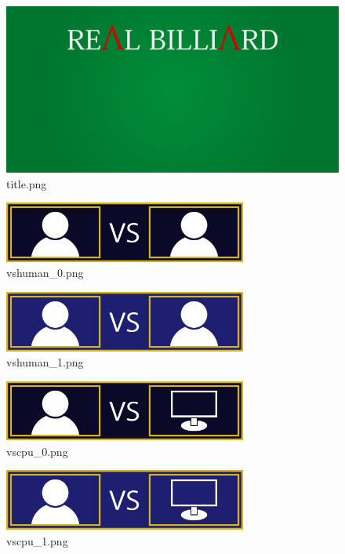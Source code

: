 \documentclass[a4j,titlepage]{jsarticle}
\begin{document}
\begin{figure}[H]
  \centering
  \includegraphics[width=12cm]{../images/title.png}
  \caption{title.png}
  \label{fig:title}
\end{figure}

\begin{figure}[H]
  \centering
  \includegraphics[width=8cm]{../images/vshuman_0.png}
  \caption{vshuman\_0.png}
  \label{fig:vshuman_0}
\end{figure}

\begin{figure}[H]
  \centering
  \includegraphics[width=8cm]{../images/vshuman_1.png}
  \caption{vshuman\_1.png}
  \label{fig:vshuman_1}
\end{figure}

\begin{figure}[H]
  \centering
  \includegraphics[width=8cm]{../images/vscpu_0.png}
  \caption{vscpu\_0.png}
  \label{fig:vscpu_0}
\end{figure}

\begin{figure}[H]
  \centering
  \includegraphics[width=8cm]{../images/vscpu_1.png}
  \caption{vscpu\_1.png}
  \label{fig:vscpu_1}
\end{figure}
\end{document}
